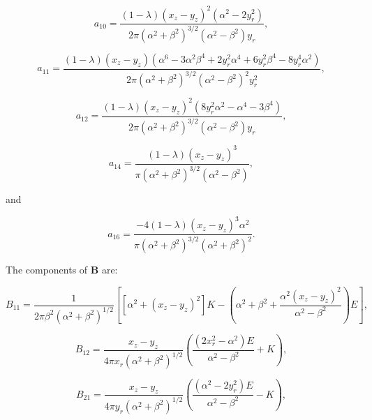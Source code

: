 \documentclass[12pt]{article}
\begin{document}
\begin{equation}
\label{equ:coeff_a10}
a_{10} = \frac{(1 - \lambda) (x_{z} - y_{z})^{2} (\alpha^{2} - 2 y_{r}^{2})}{2 \pi (\alpha^{2} + \beta^{2})^{3/2} (\alpha^{2} - \beta^{2}) y_{r}},
\end{equation}

\begin{equation}
\label{equ:coeff_a11}
a_{11} = \frac{(1 - \lambda) (x_{z} - y_{z}) (\alpha^{6} - 3 \alpha^{2} \beta^{4} + 2 y_{r}^{2} \alpha^{4} + 6 y_{r}^{2} \beta^{4} - 8 y_{r}^{4} \alpha^{2})}{2 \pi (\alpha^{2} + \beta^{2})^{3/2} (\alpha^{2} - \beta^{2})^{2} y_{r}^{2}},
\end{equation}

\begin{equation}
\label{equ:coeff_a12}
a_{12} = \frac{(1 - \lambda) (x_{z} - y_{z})^{2} (8 y_{r}^{2} \alpha^{2} - \alpha^{4} - 3 \beta^{4})}{2 \pi (\alpha^{2} + \beta^{2})^{3/2} (\alpha^{2} - \beta^{2}) y_{r}},
\end{equation}

\begin{equation}
\label{equ:coeff_a14}
a_{14} = \frac{(1 - \lambda) (x_{z} - y_{z})^{3}}{\pi (\alpha^{2} + \beta^{2})^{3/2} (\alpha^{2} - \beta^{2})},
\end{equation}

and 

\begin{equation}
\label{equ:coeff_a16}
a_{16} = \frac{-4 (1 - \lambda) (x_{z} - y_{z})^{3} \alpha^{2}}{\pi (\alpha^{2} + \beta^{2})^{3/2} (\alpha^{2} + \beta^{2})^{2}}.
\end{equation}

The components of $\boldsymbol{B}$ are:

\begin{equation}
\label{equ:B11_comp}
B_{11} = \frac{1}{2 \pi \beta^{2} (\alpha^{2} + \beta^{2})^{1/2}} \left[ [\alpha^{2} + (x_{z} - y_{z})^{2}] K - \left( \alpha^{2} + \beta^{2} + \frac{\alpha^{2} (x_{z} - y_{z})^{2}}{\alpha^{2} - \beta^{2}}\right) E\right],
\end{equation}


\begin{equation}
\label{equ:B12_comp}
B_{12} = \frac{x_{z} - y_{z}}{4 \pi x_{r} (\alpha^{2} + \beta^{2})^{1/2}} \left( \frac{(2 x_{r}^{2} - \alpha^{2}) E}{\alpha^{2} - \beta^{2}} + K \right),
\end{equation}

\begin{equation}
\label{equ:B21_comp}
B_{21} = \frac{x_{z} - y_{z}}{4 \pi y_{r} (\alpha^{2} + \beta^{2})^{1/2}} \left( \frac{(\alpha^{2} - 2 y_{r}^{2}) E}{\alpha^{2} - \beta^{2}} - K\right),
\end{equation}
\end{document}
